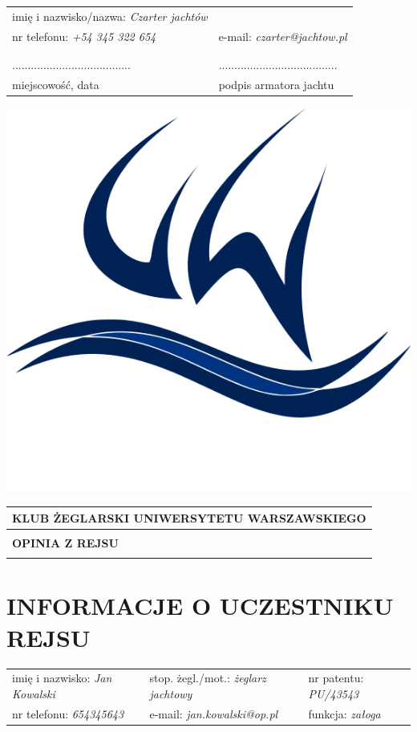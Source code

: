 \documentclass{article}
\begin{document}
\begin{tabularx}{\textwidth}{X X}
imię i nazwisko/nazwa: \textit{Czarter jachtów} \\
nr telefonu: \textit{+54 345 322 654} & e-mail: \textit{czarter@jachtow.pl}\\
\\\\
...................................... & ......................................\\
miejscowość, data & podpis armatora jachtu\\
\end{tabularx}
\newpage
\begin{minipage}{0.11\textwidth}
\includegraphics[width=\textwidth]{logo.png}
\end{minipage}
\begin{minipage}{0.89\textwidth}
\begin{tabularx}{\textwidth} { 
  | >{\centering\arraybackslash}X | }
 \hline
 \textbf{KLUB ŻEGLARSKI UNIWERSYTETU WARSZAWSKIEGO} \\
 \hline
 \\
 \textbf{\huge OPINIA Z REJSU} \\
 \\
\hline
\end{tabularx}
\end{minipage}

\section*{INFORMACJE O UCZESTNIKU REJSU}
\begin{tabularx}{\textwidth}{X X X}
imię i nazwisko: \textit{Jan Kowalski} & stop. żegl./mot.: \textit{żeglarz jachtowy} & nr patentu: \textit{PU/43543} \\
nr telefonu: \textit{654345643} & e-mail: \textit{jan.kowalski@op.pl} & funkcja: \textit{załoga} \\
\end{tabularx}
\end{document}

